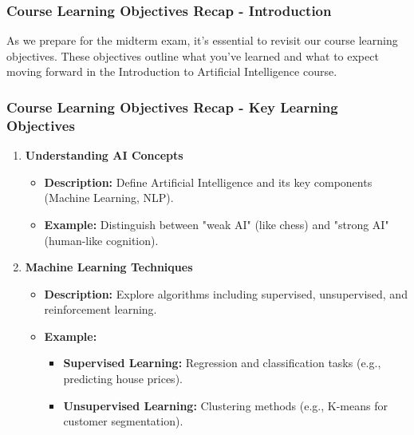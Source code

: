 \documentclass{beamer}
\begin{document}
\begin{frame}[fragile]
    \frametitle{Course Learning Objectives Recap - Introduction}
    As we prepare for the midterm exam, it's essential to revisit our course learning objectives. These objectives outline what you've learned and what to expect moving forward in the Introduction to Artificial Intelligence course.
\end{frame}

\begin{frame}[fragile]
    \frametitle{Course Learning Objectives Recap - Key Learning Objectives}
    \begin{enumerate}
        \item \textbf{Understanding AI Concepts}
        \begin{itemize}
            \item \textbf{Description:} Define Artificial Intelligence and its key components (Machine Learning, NLP).
            \item \textbf{Example:} Distinguish between "weak AI" (like chess) and "strong AI" (human-like cognition).
        \end{itemize}
        
        \item \textbf{Machine Learning Techniques}
        \begin{itemize}
            \item \textbf{Description:} Explore algorithms including supervised, unsupervised, and reinforcement learning.
            \item \textbf{Example:} 
            \begin{itemize}
                \item \textbf{Supervised Learning:} Regression and classification tasks (e.g., predicting house prices).
                \item \textbf{Unsupervised Learning:} Clustering methods (e.g., K-means for customer segmentation).
            \end{itemize}
        \end{itemize}
    \end{enumerate}
\end{frame}
\end{document}
